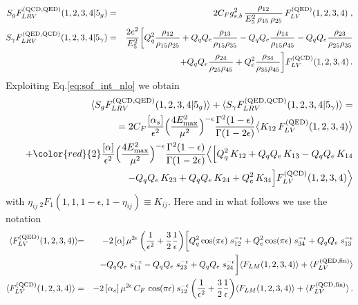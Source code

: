 \documentclass[12pt,a4paper]{article}
\newcommand{\nn}{\nonumber}
\newcommand{\eps}{\epsilon}
\newcommand{\beq}{\begin{eqnarray}}
\newcommand{\eeq}{\end{eqnarray}}
\begin{document}
\beq
S_g F_{LRV}^{({\rm QCD, QED})}(1,2,3,4 | 5_g)
&=&
 2 C_F g_{s,b}^2 \, 
\frac{\rho_{12}}{E_5^2 \, \rho_{15} \, \rho_{25}} \, F_{LV}^{({\rm QED})}(1,2,3,4) \; ,
\nn \\
S_\gamma F_{LRV}^{({\rm QED, QCD})}(1,2,3,4 | 5_\gamma)
&=&
 \frac{ 2 e^2 }{E_5^2} 
\bigg[ 
 Q^2_q  \frac{\rho_{12}}{\rho_{15} \rho_{25}}
+ Q_q Q_{e} \frac{\rho_{13}}{\rho_{15} \rho_{35}}
- Q_q Q_{e}\frac{\rho_{14}}{\rho_{15} \rho_{45}}
- Q_{q}Q_{e} \frac{\rho_{23}}{\rho_{25} \rho_{35}}
\nn \\
&& \hspace{12mm}
+ Q_{q} Q_{e} \frac{\rho_{24}}{\rho_{25} \rho_{45}}
+ Q^2_{e} \frac{\rho_{34}}{\rho_{35} \rho_{45}}
\bigg]
F_{LV}^{({\rm QCD})}(1,2,3,4)
  \, .
 \nn
\eeq
Exploiting Eq.\eqref{eq:sof_int_nlo} we obtain
\beq
&&
\hspace{-2cm}
\langle S_g F_{LRV}^{({\rm QCD, QED})}(1,2,3,4 | 5_g) \rangle
+ \langle S_\gamma F_{LRV}^{({\rm QED, QCD})}(1,2,3,4 | 5_\gamma) \rangle =
\nn \\
&& =
2 C_F
\frac{[\alpha_s]}{\eps^2} \Big(\frac{4 E^2_{\rm max}}{\mu^2}\Big)^{-\eps} \frac{\Gamma^2(1-\eps)}{\Gamma(1-2\eps)} 
\big\langle
K_{12}  \, F_{LV}^{({\rm QED})}(1,2,3,4) 
\big\rangle
\nn \\
&& \quad 
+{\color{red}{2}}\frac{[\alpha]}{\eps^2} \Big(\frac{4 E^2_{\rm max}}{\mu^2}\Big)^{-\eps} \frac{\Gamma^2(1-\eps)}{\Gamma(1-2\eps)} 
\Big\langle
\Big[ 
 Q^2_q \, K_{12}
+ Q_q Q_{e} \, K_{13}
- Q_q Q_{e} \, K_{14}
\nn \\
&& \hspace{3cm}
- Q_{q}Q_{e} \, K_{23}
+ Q_{q} Q_{e} \, K_{24}
+ Q^2_{e} \, K_{34}
\Big]
F_{LV}^{({\rm QCD})}(1,2,3,4)
\Big\rangle
\eeq
with $\eta_{ij} \, {}_2F_1 (1, 1, 1-\eps, 1-\eta_{ij})  \equiv K_{ij}$. Here and in what follows we use the notation
\beq
\langle F_{LV}^{({\rm QED})}(1,2,3,4) \rangle
\! \! &=& \!\!
-
2 \, [\alpha]\, \mu^{2\eps}\, \bigg( \frac1{\eps^{2}}+\frac32 \frac1\eps\bigg)
\bigg[
Q_q^2  \cos(\pi \eps)\; s_{12}^{-\eps}
+ Q_e^2  \cos(\pi \eps)\; s_{34}^{-\eps}
+ Q_q Q_e \; s_{13}^{-\eps}
\nn \\
&& 
- Q_q Q_e \; s_{14}^{-\eps}
- Q_q Q_e \; s_{23}^{-\eps}
+ Q_q Q_e \; s_{24}^{-\eps}
\bigg] \langle F_{LM} (1,2,3,4) \rangle
+\langle F_{LV}^{(\rm QED, fin)} \rangle
\nn \\
\langle F_{LV}^{({\rm QCD})}(1,2,3,4)\rangle
&=&
 -2 \, [\alpha_{s}]\, \mu^{2\eps} \, C_{F} \, \cos(\pi \eps)\, s_{12}^{-\eps} \,  \bigg( \frac1{\eps^{2}}+\frac32 \frac1\eps\bigg) \langle F_{LM} (1,2,3,4) \rangle
+\langle F_{LV}^{(\rm QCD, fin)} \rangle \, .
\nn \\
\eeq
\end{document}

